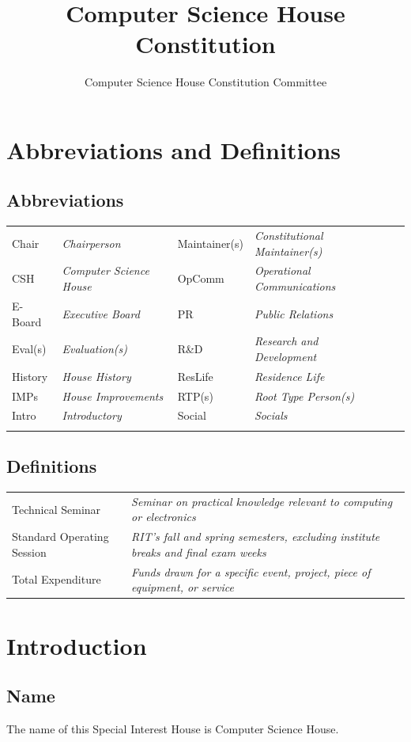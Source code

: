 \documentclass{article}
\title{Computer Science House Constitution}
\author{Computer Science House Constitution Committee}
\date{\datechanged}
\newcommand{\article}[1]{\section{#1} \label{#1}}
\newcommand{\asection}[1]{\subsection{#1} \label{#1}}
\begin{document}
\maketitle

\tableofcontents
\setcounter{page}{4}

\article{Abbreviations and Definitions}

\asection{Abbreviations}
\begin{tabular}{ l  l  l l l l}
	Chair   & \textit{Chairperson}            & Maintainer(s) & \textit{Constitutional Maintainer(s)} \\
	CSH     & \textit{Computer Science House} & OpComm        & \textit{Operational Communications}   \\
	E-Board & \textit{Executive Board}        & PR            & \textit{Public Relations}             \\
	Eval(s) & \textit{Evaluation(s)}          & R\&D          & \textit{Research and Development}     \\
	History & \textit{House History}          & ResLife       & \textit{Residence Life}               \\
	IMPs    & \textit{House Improvements}     & RTP(s)        & \textit{Root Type Person(s)}          \\
	Intro   & \textit{Introductory}           & Social        & \textit{Socials}                      \\                                  \\
\end{tabular}

\asection{Definitions}

\begin{tabular}{l l}
	Technical Seminar          & \textit{Seminar on practical knowledge relevant to computing or electronics} \\                                     
	Standard Operating Session & \textit{RIT's fall and spring semesters, excluding institute breaks and final exam weeks} \\
	Total Expenditure          & \textit{Funds drawn for a specific event, project, piece of equipment, or service}
\end{tabular}

\article{Introduction}

\asection{Name}
The name of this Special Interest House is Computer Science House.
\end{document}
